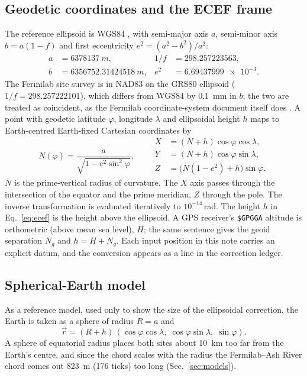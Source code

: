 \documentclass[11pt,letterpaper]{article}
\newcommand{\code}[1]{\texttt{#1}}
\begin{document}
\subsection{Geodetic coordinates and the ECEF frame}
The reference ellipsoid is WGS84 \cite{wgs84}, with semi-major axis $a$, semi-minor axis $b=a(1-f)$ and first eccentricity $e^2=(a^2-b^2)/a^2$:
\begin{equation}
\begin{aligned}
a&=\SI{6378137}{m}, & 1/f&=298.257223563,\\
b&=\SI{6356752.31424518}{m}, & e^2&=\num{6.69437999e-3}.
\end{aligned}
\end{equation}
The Fermilab site survey is in NAD83 on the GRS80 ellipsoid ($1/f=298.257222101$), which differs from WGS84 by \SI{0.1}{mm} in $b$; the two are treated as coincident, as the Fermilab coordinate-system document itself does \cite{oshinowo1997}.  A point with geodetic latitude $\varphi$, longitude $\lambda$ and ellipsoidal height $h$ maps to Earth-centred Earth-fixed Cartesian coordinates by
\begin{equation}
N(\varphi)=\frac{a}{\sqrt{1-e^2\sin^2\varphi}},\qquad
\begin{aligned}
X&=(N+h)\cos\varphi\cos\lambda,\\
Y&=(N+h)\cos\varphi\sin\lambda,\\
Z&=\bigl(N(1-e^2)+h\bigr)\sin\varphi .
\end{aligned}
\label{eq:ecef}
\end{equation}
$N$ is the prime-vertical radius of curvature.  The $X$ axis passes through the intersection of the equator and the prime meridian, $Z$ through the pole.  The inverse transformation is evaluated iteratively to $10^{-14}$\,rad.  The height $h$ in Eq.~\eqref{eq:ecef} is the height above the ellipsoid.  A GPS receiver's \code{\$GPGGA} altitude is orthometric (above mean sea level), $H$; the same sentence gives the geoid separation $N_g$ and $h=H+N_g$.  Each input position in this note carries an explicit datum, and the conversion appears as a line in the correction ledger.

\subsection{Spherical-Earth model}
As a reference model, used only to show the size of the ellipsoidal correction, the Earth is taken as a sphere of radius $R=a$ and
\begin{equation}
\vec r=(R+h)\,(\cos\varphi\cos\lambda,\;\cos\varphi\sin\lambda,\;\sin\varphi).
\label{eq:sphere}
\end{equation}
A sphere of equatorial radius places both sites about \SI{10}{km} too far from the Earth's centre, and since the chord scales with the radius the Fermilab--Ash River chord comes out \SI{823}{m} (\num{176} ticks) too long (Sec.~\ref{sec:models}).
\end{document}
